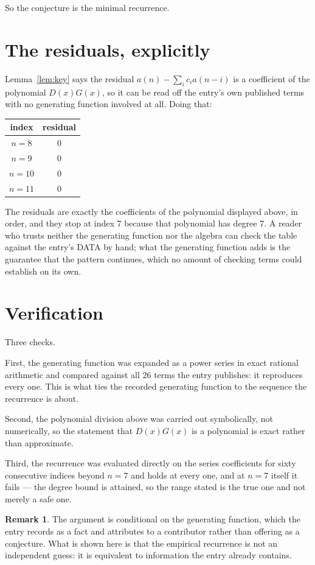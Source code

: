 \documentclass[11pt,a4paper]{article}
\theoremstyle{plain}
\theoremstyle{definition}
\newtheorem{remark}[theorem]{Remark}
\begin{document}
So the conjecture is the minimal recurrence.

\section{The residuals, explicitly}

Lemma~\ref{lem:key} says the residual $a(n)-\sum_ic_ia(n-i)$ is a coefficient of the
polynomial $D(x)G(x)$, so it can be read off the entry's own published terms with no
generating function involved at all. Doing that:
\begin{center}
\begin{tabular}{cc}
index & residual \\ \hline
$n=8$ & $0$ \\
$n=9$ & $0$ \\
$n=10$ & $0$ \\
$n=11$ & $0$
\end{tabular}
\end{center}
The residuals are exactly the coefficients of the polynomial displayed above, in order, and
they stop at index $7$ because that polynomial has degree $7$. A reader who trusts
neither the generating function nor the algebra can check the table against the entry's DATA
by hand; what the generating function adds is the guarantee that the pattern continues, which
no amount of checking terms could establish on its own.

\section{Verification}

Three checks.

First, the generating function was expanded as a power series in exact rational arithmetic and
compared against all $26$ terms the entry publishes: it reproduces every one. This is
what ties the recorded generating function to the sequence the recurrence is about.

Second, the polynomial division above was carried out symbolically, not numerically, so the
statement that $D(x)G(x)$ is a polynomial is exact rather than approximate.

Third, the recurrence was evaluated directly on the series coefficients for sixty consecutive
indices beyond $n=7$ and holds at every one, and at $n=7$ itself it fails --- the
degree bound is attained, so the range stated is the true one and not merely a safe one.

\begin{remark}
The argument is conditional on the generating function, which the entry records as a fact and
attributes to a contributor rather than offering as a conjecture. What is shown here is that
the empirical recurrence is not an independent guess: it is equivalent to information the
entry already contains.
\end{remark}
\end{document}
